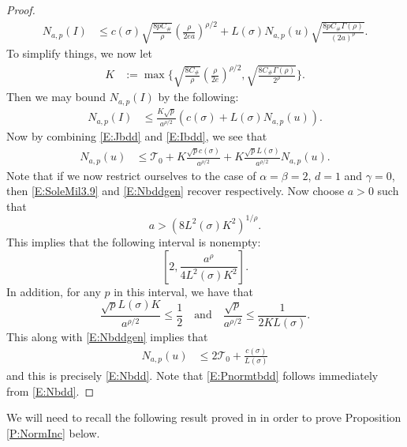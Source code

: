 \documentclass[a4paper,11pt]{article}
\numberwithin{equation}{section}
\theoremstyle{plain}
\theoremstyle{definition}
\numberwithin{NQ}{section}
\numberwithin{LQ}{section}
\numberwithin{ZQ}{section}
\begin{document}
\begin{proof}
  \begin{align}
  N_{a,p}(I) &\le  c(\sigma)\sqrt{\frac{8pC_{\#}  }{\rho}} \left(\frac{\rho}{2ea}\right)^{\rho/2} +  L(\sigma)N_{a,p}(u) \sqrt{\frac{8pC_{\#} \Gamma\left( \rho \right)}{(2a)^\rho} }. \label{E:SoleMil3.9}
  \end{align}
  To simplify things, we now let
  \begin{align*}
  K&:= \max\Bigg\{\sqrt{\frac{8C_{\#}  }{\rho}} \left(\frac{\rho}{2e}\right)^{\rho/2}, \sqrt{\frac{8C_{\#} \Gamma\left( \rho \right) }{2^{\rho}}}  \Bigg\}.
  \end{align*}
  Then we may bound $N_{a,p}(I)$ by the following:
  \begin{align}
  \label{E:Ibdd}
  N_{a,p}(I) &\le\frac{K \sqrt{p}}{a^{\rho/2}}\left( c(\sigma) + L(\sigma)N_{a,p}(u) \right).
  \end{align}
  Now by combining \eqref{E:Jbdd} and \eqref{E:Ibdd}, we see that
  \begin{align}
  N_{a,p}(u) & \le \mathcal{T}_0   + K\frac{\sqrt{p}c(\sigma)}{a^{\rho/2} }  + K  \frac{\sqrt{p}L(\sigma)}{a^{\rho/2}} N_{a,p}(u). \label{E:Nbddgen}
  \end{align}
  Note that if we now restrict ourselves to the case of $\alpha = \beta = 2$, $d=1$ and $\gamma =0$, then \eqref{E:SoleMil3.9} and \eqref{E:Nbddgen} recover \cite[(3.9) and (3.10)]{millet.sanz-sole:21:global} respectively. Now choose $a>0$ such that
  \[
  a > \left( 8 L^2(\sigma)K^2\right)^{1/\rho}.
  \]
  This implies that the following interval is nonempty:
  \[
  \left[ 2, \frac{a^{\rho}}{4L^2(\sigma)K^2} \right].
  \]
  In addition, for any $p$ in this interval, we have that
  \[
  \frac{\sqrt{p}L(\sigma)K}{a^{\rho/2}} \le \frac{1}{2}
  \quad \text{and} \quad
  \frac{\sqrt{p}}{a^{\rho/2}}  \le \frac{1}{2KL(\sigma)}.
  \]
  This along with \eqref{E:Nbddgen} implies that
  \begin{align*}
  N_{a,p}(u) & \le 2 \mathcal{T}_0 + \frac{c(\sigma)}{L(\sigma)}
  \end{align*}
  and this is precisely \eqref{E:Nbdd}. Note that \eqref{E:Pnormtbdd} follows immediately from \eqref{E:Nbdd}.
\end{proof}

	We will need to recall the following result proved in \cite{chen.hu.ea:19:nonlinear} in order to prove Proposition \ref{P:NormInc} below.
\end{document}
